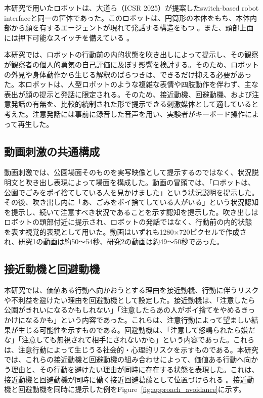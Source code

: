 \documentclass[utf8]{FrontiersinHarvard}
\begin{document}
本研究で用いたロボットは、大道ら（ICSR 2025）が提案したswitch-based robot interfaceと同一の筐体であった。このロボットは、円筒形の本体をもち、本体内部から顔を有するエージェントが現れて発話する構造をもつ \citep{omichi2026}。また、頭部上面には押下可能なスイッチを備えている \citep{omichi2026}。

本研究では、ロボットの行動前の内的状態を吹き出しによって提示し、その観察が観察者の個人的勇気の自己評価に及ぼす影響を検討する。そのため、ロボットの外見や身体動作から生じる解釈のばらつきは、できるだけ抑える必要があった。本ロボットは、人型ロボットのような複雑な表情や四肢動作を伴わず、主な表出が顔の提示と発話に限定される。そのため、接近動機、回避動機、および注意発話の有無を、比較的統制された形で提示できる刺激媒体として適していると考えた。注意発話には事前に録音した音声を用い、実験者がキーボード操作によって再生した。


\subsection{動画刺激の共通構成}

動画刺激では、公園場面そのものを実写映像として提示するのではなく、状況説明文と吹き出し表現によって場面を構成した。動画の冒頭では、「ロボットは、公園でごみをポイ捨てしている人を見かけました」という状況説明を提示した。その後、吹き出し内に「あ、ごみをポイ捨てしている人がいる」という状況認知を提示し、続いて注意すべき状況であることを示す認知を提示した。吹き出しはロボットの頭部付近に提示され、ロボットの発話ではなく、行動前の内的状態を表す視覚的表現として用いた。動画はいずれも1280×720ピクセルで作成され、研究1の動画は約50〜54秒、研究2の動画は約49〜50秒であった。

\subsection{接近動機と回避動機}

本研究では、価値ある行動へ向かおうとする理由を接近動機、行動に伴うリスクや不利益を避けたい理由を回避動機として設定した。接近動機は、「注意したら公園がきれいになるかもしれない」「注意したらあの人がポイ捨てをやめるきっかけになるかも」という内容であった。これらは、注意行動によって望ましい結果が生じる可能性を示すものである。回避動機は、「注意して怒鳴られたら嫌だな」「注意しても無視されて相手にされないかも」という内容であった。これらは、注意行動によって生じうる社会的・心理的リスクを示すものである。本研究では、これらの接近動機と回避動機の組み合わせによって、価値ある行動へ向かう理由と、その行動を避けたい理由が同時に存在する状態を表現した。これは、接近動機と回避動機が同時に働く接近回避葛藤として位置づけられる \citep{lewin1931,miller1944}。接近動機と回避動機を同時に提示した例をFigure~\ref{fig:approach_avoidance}に示す。
\end{document}
